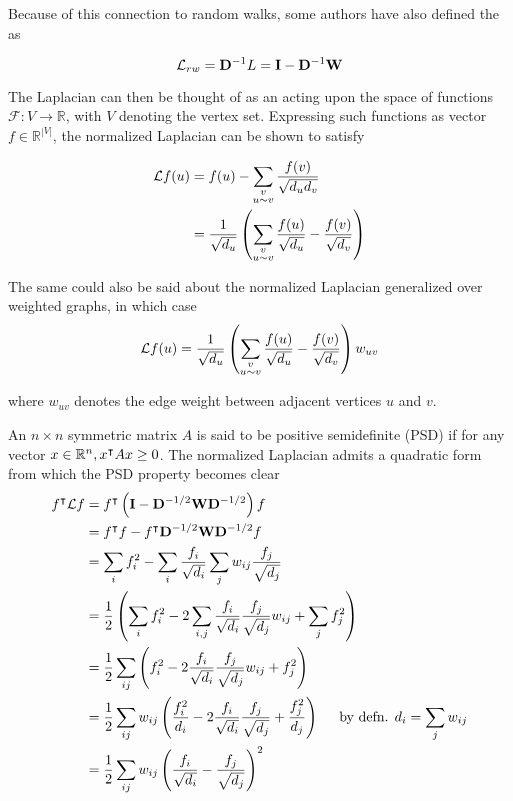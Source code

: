 Because of this connection to random walks, some authors have also defined the  as

\begin{equation}
\mathbf{\mathcal{L}}_{rw} = \mathbf{D}^{-1} L = \mathbf{I} - \mathbf{D}^{-1} \mathbf{W}
\end{equation}

The Laplacian can then be thought of as an  acting upon the space of
functions $\mathcal{F} : V \to \mathbb{R}$, with $V$ denoting the vertex set.
Expressing such functions as vector $f \in \mathbb{R}^{|V|}$, the normalized Laplacian
can be shown to satisfy
 
\begin{align}
\mathcal{L}f(u) &= f(u) - \sum_{\substack{ v \\ u \sim v}} \frac{f(v)}{\sqrt{d_ud_v}} \notag \\
 &= \frac{1}{\sqrt{d_u}} \left( \sum_{\substack{ v \\ u \sim v}} \frac{f(u)}{\sqrt{d_u}} - \frac{f(v)}{\sqrt{d_v}} \right)
\label{eq:difference-operator}
\end{align}

The same could also be said about the normalized Laplacian generalized over weighted
graphs, in which case
\begin{equation}
\mathbf{\mathcal{L}} f (u) = \frac{1}{\sqrt{d_u}} \left( \sum_{\substack{ v \\ u \sim v}} \frac{f(u)}{\sqrt{d_u}} - \frac{f(v)}{\sqrt{d_v}} \right) w_{uv}
\end{equation}

where $w_{uv}$ denotes the edge weight between adjacent vertices $u$ and $v$. 

An $n \times  n$ symmetric matrix $A$ is said to be positive semidefinite (PSD) if for any vector $x \in \mathbb{R}^n, x^\intercal A x \geq 0$.  The normalized Laplacian admits a quadratic form from which the PSD property becomes clear
\begin{align}
f^\intercal \mathbf{\mathcal{L}} f &= f^\intercal \left( \mathbf{I} - \mathbf{D}^{-1/2} \mathbf{W} \mathbf{D}^{-1/2} \right) f \notag \\
&= f^\intercal f - f^\intercal \mathbf{D}^{-1/2} \mathbf{W} \mathbf{D}^{-1/2} f \notag \notag \\
&= \sum_{i} f_i^2 - \sum_{i} \frac{f_i}{\sqrt{d_i}} \sum_j w_{ij} \frac{f_j}{\sqrt{d_j}} \notag \\
&= \frac{1}{2} \left( \sum_i f_i^2 - 2 \sum_{i,j} \frac{f_i}{\sqrt{d_i}} \frac{f_j}{\sqrt{d_j}} w_{ij} + \sum_j f_j^2 \right) \notag \\
&= \frac{1}{2} \sum_{ij} \left(  f_i^2 -2\frac{f_i}{\sqrt{d_i}}\frac{f_j}{\sqrt{d_j}} w_{ij}  + f_j^2 \right) \notag \\
&=  \frac{1}{2} \sum_{ij} w_{ij} \left(  \frac{f_i^2}{d_i} -2\frac{f_i}{\sqrt{d_i}}\frac{f_j}{\sqrt{d_j}} + \frac{f_j^2}{d_j} \right) \hspace{5mm} \text{by defn. $d_i = \sum_j w_{ij}$} \notag \\
&= \frac{1}{2} \sum_{ij} w_{ij} \left( \frac{f_i}{\sqrt{d_i}} - \frac{f_j}{\sqrt{d_j}} \right)^2
\label{eq:quadratic-form}
\end{align}

